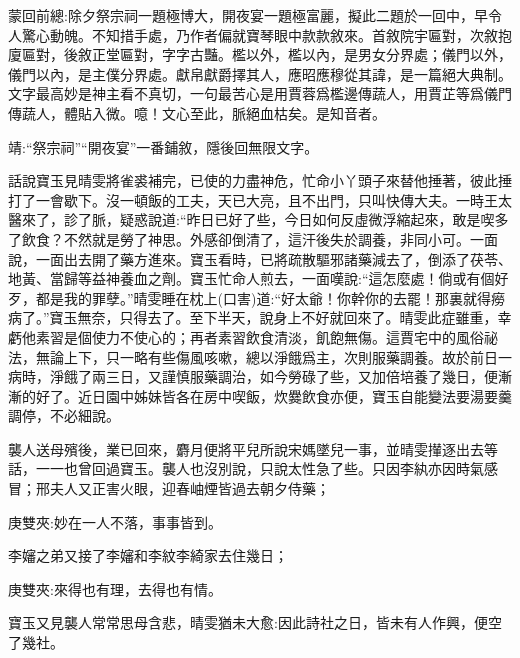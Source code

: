 

\begin{parag}
    \begin{note}蒙回前總:除夕祭宗祠一題極博大，開夜宴一題極富麗，擬此二題於一回中，早令人驚心動魄。不知措手處，乃作者偏就寶琴眼中款款敘來。首敘院宇匾對，次敘抱廈匾對，後敘正堂匾對，字字古豔。檻以外，檻以內，是男女分界處；儀門以外，儀門以內，是主僕分界處。獻帛獻爵擇其人，應昭應穆從其諱，是一篇絕大典制。文字最高妙是神主看不真切，一句最苦心是用賈蓉爲檻邊傳蔬人，用賈芷等爲儀門傳蔬人，體貼入微。噫！文心至此，脈絕血枯矣。是知音者。\end{note}
\end{parag}


\begin{parag}
    \begin{note}靖:“祭宗祠”“開夜宴”一番鋪敘，隱後回無限文字。\end{note}
\end{parag}


\begin{parag}
    話說寶玉見晴雯將雀裘補完，已使的力盡神危，忙命小丫頭子來替他捶著，彼此捶打了一會歇下。沒一頓飯的工夫，天已大亮，且不出門，只叫快傳大夫。一時王太醫來了，診了脈，疑惑說道:“昨日已好了些，今日如何反虛微浮縮起來，敢是喫多了飲食？不然就是勞了神思。外感卻倒清了，這汗後失於調養，非同小可。一面說，一面出去開了藥方進來。寶玉看時，已將疏散驅邪諸藥減去了，倒添了茯苓、地黃、當歸等益神養血之劑。寶玉忙命人煎去，一面嘆說:“這怎麼處！倘或有個好歹，都是我的罪孽。”晴雯睡在枕上(口害)道:“好太爺！你幹你的去罷！那裏就得癆病了。”寶玉無奈，只得去了。至下半天，說身上不好就回來了。晴雯此症雖重，幸虧他素習是個使力不使心的；再者素習飲食清淡，飢飽無傷。這賈宅中的風俗祕法，無論上下，只一略有些傷風咳嗽，總以淨餓爲主，次則服藥調養。故於前日一病時，淨餓了兩三日，又謹慎服藥調治，如今勞碌了些，又加倍培養了幾日，便漸漸的好了。近日園中姊妹皆各在房中喫飯，炊爨飲食亦便，寶玉自能變法要湯要羹調停，不必細說。
\end{parag}


\begin{parag}
    襲人送母殯後，業已回來，麝月便將平兒所說宋媽墜兒一事，並晴雯攆逐出去等話，一一也曾回過寶玉。襲人也沒別說，只說太性急了些。只因李紈亦因時氣感冒；邢夫人又正害火眼，迎春岫煙皆過去朝夕侍藥；\begin{note}庚雙夾:妙在一人不落，事事皆到。\end{note}李嬸之弟又接了李嬸和李紋李綺家去住幾日；\begin{note}庚雙夾:來得也有理，去得也有情。\end{note}寶玉又見襲人常常思母含悲，晴雯猶未大愈:因此詩社之日，皆未有人作興，便空了幾社。
\end{parag}


